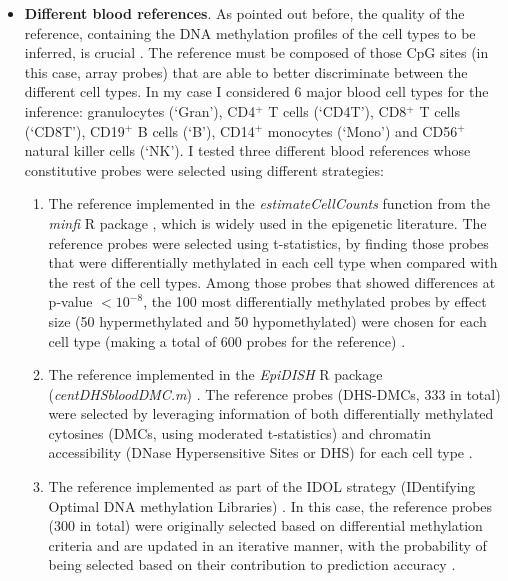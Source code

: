 \begin{itemize}
	
	\item \textbf{Different blood references}. As pointed out before, the quality of the reference, containing the DNA methylation profiles of the cell types to be inferred, is crucial \cite{Teschendorff2017a,Koestler2016}. The reference must be composed of those CpG sites (in this case, array probes) that are able to better discriminate between the different cell types. In my case I considered 6 major blood cell types for the inference: granulocytes (`\acrshort{Gran}'), CD4$^+$ T cells (`\acrshort{CD4T}'), CD8$^+$ T cells (`\acrshort{CD8T}'), CD19$^+$ B cells (`\acrshort{B}'), CD14$^+$ monocytes (`\acrshort{Mono}') and  CD56$^+$ natural killer cells (`\acrshort{NK}'). I tested three different blood references whose constitutive probes were selected using different strategies:
	
	\begin{enumerate}
		
		\item The reference implemented in the \textit{estimateCellCounts} function from the \textit{minfi} R package \cite{Aryee2014}, which is widely used in the epigenetic literature. The reference probes were selected using t-statistics, by finding those probes that were differentially methylated in each cell type when compared with the rest of the cell types. Among those probes that showed differences at p-value $< 10^{-8}$, the 100 most differentially methylated probes by effect size (50 hypermethylated and 50 hypomethylated) were chosen for each cell type (making a total of 600 probes for the reference) \cite{Jaffe2014}. 
		
		\smallskip
		
		\item The reference implemented in the \textit{EpiDISH} R package (\textit{centDHSbloodDMC.m}) \cite{Teschendorff2017b}. The reference probes (\acrshort{DHS-DMCs}, 333 in total) were selected by leveraging information of both differentially methylated cytosines (\acrshort{DMCs}, using moderated t-statistics) and chromatin accessibility (DNase Hypersensitive Sites or \acrshort{DHS}) for each cell type \cite{Teschendorff2017a}.  
		
		\item The reference implemented as part of the \acrshort{IDOL} strategy (IDentifying Optimal DNA methylation Libraries) \cite{Koestler2016}. In this case, the reference probes (300 in total) were originally selected based on differential methylation criteria and are updated in an iterative manner, with the probability of being selected based on their contribution to prediction accuracy \cite{Koestler2016}.
	

\end{enumerate}
\end{itemize}
